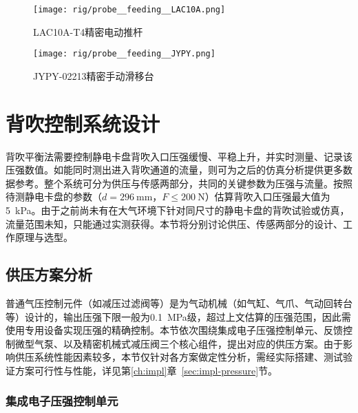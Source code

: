 \begin{figure}[tbh]
\centering
\texttt{[image: rig/probe\_\_feeding\_\_LAC10A.png]}
\caption{LAC10A-T4精密电动推杆}
\label{fig:rig-probe-feeding-LAC10A}
\end{figure}

\begin{figure}[tbh]
\centering
\texttt{[image: rig/probe\_\_feeding\_\_JYPY.png]}
\caption{JYPY-02213精密手动滑移台}
\label{fig:rig-probe-feeding-JYPY}
\end{figure}



\clearpage



\section{背吹控制系统设计}\label{sec:rig-pressure}

背吹平衡法需要控制静电卡盘背吹入口压强缓慢、平稳上升，并实时测量、记录该压强数值。如能同时测出进入背吹通道的流量，则可为之后的仿真分析提供更多数据参考。整个系统可分为供压与传感两部分，共同的关键参数为压强与流量。按照待测静电卡盘的参数（$d = \SI{296}{\mm}$，$F \leq \SI{200}{\N}$）估算背吹入口压强最大值为\SI{5}{\kPa}\footnotemark{}。由于之前尚未有在大气环境下针对同尺寸的静电卡盘的背吹试验或仿真，流量范围未知，只能通过实测获得。本节将分别讨论供压、传感两部分的设计、工作原理与选型。



\subsection{供压方案分析}\label{sec:rig-pressure-supply}

普通气压控制元件（如减压过滤阀等）是为气动机械（如气缸、气爪、气动回转台等）设计的，输出压强下限一般为\SI{0.1}{\MPa}级，超过上文估算的压强范围，因此需使用专用设备实现压强的精确控制。本节依次围绕集成电子压强控制单元、反馈控制微型气泵、以及精密机械式减压阀三个核心组件，提出对应的供压方案。由于影响供压系统性能因素较多，本节仅针对各方案做定性分析，需经实际搭建、测试验证方案可行性与性能，详见第\ref{ch:impl}章~\ref{sec:impl-pressure}节。

\subsubsection{集成电子压强控制单元}\label{sec:rig-pressure-supply-integrated}

